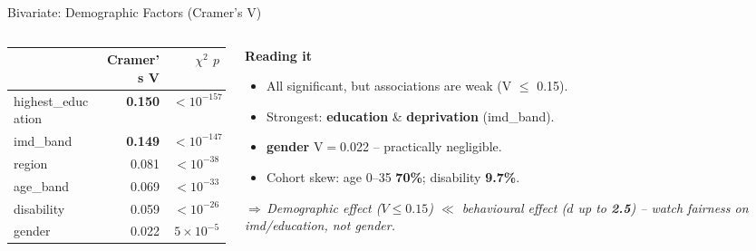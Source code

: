 \documentclass[aspectratio=169,10pt]{beamer}
\newcommand{\hc}[1]{{\bfseries\color{white}#1}}
\newcommand{\takeaway}[1]{\vspace{2pt}\par{\footnotesize\itshape\textcolor{themecol}{$\Rightarrow$\,}#1}}
\begin{document}
\begin{frame}{Bivariate: Demographic Factors (Cramer's V)}
  \begin{columns}[T]
    \begin{column}{0.50\textwidth}
      {\scriptsize
      \setlength{\tabcolsep}{4pt}\renewcommand{\arraystretch}{1.25}
      \begin{tabularx}{\textwidth}{@{}>{\ttfamily}l r r@{}}
        \toprule
        \rowcolor{themecol}\hc{Factor} & \hc{Cramer's V} & \hc{$\chi^2$ $p$}\\
        \midrule
        highest\_education & \textbf{0.150} & $<10^{-157}$\\
        \rowcolor{rowtint}
        imd\_band          & \textbf{0.149} & $<10^{-147}$\\
        region             & 0.081 & $<10^{-38}$\\
        \rowcolor{rowtint}
        age\_band          & 0.069 & $<10^{-33}$\\
        disability         & 0.059 & $<10^{-26}$\\
        \rowcolor{rowtint}
        gender             & 0.022 & $5\times10^{-5}$\\
        \bottomrule
      \end{tabularx}}
    \end{column}
    \begin{column}{0.50\textwidth}
      \footnotesize\textbf{Reading it}
      \begin{itemize}\setlength\itemsep{0.3em}
        \item All significant, but associations are \alert{weak} (V $\leq$ 0.15).
        \item Strongest: \textbf{education} \& \textbf{deprivation} (imd\_band).
        \item \textbf{gender} V$=$0.022 -- practically negligible.
        \item Cohort skew: age 0--35 \textbf{70\%}; disability \textbf{9.7\%}.
      \end{itemize}
      \takeaway{\scriptsize Demographic effect ($V\!\leq\!0.15$) $\ll$ behavioural effect ($d$ up to \textbf{2.5}) -- watch fairness on imd/education, not gender.}
    \end{column}
  \end{columns}
\end{frame}
\end{document}
